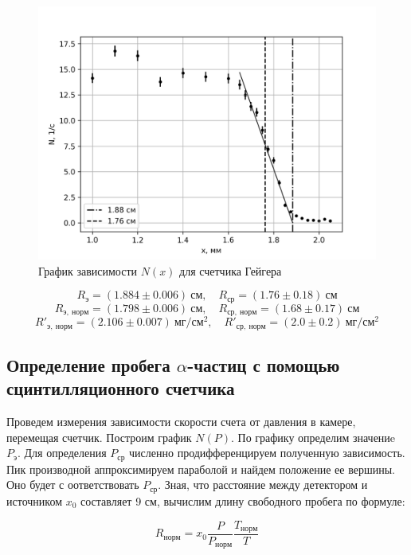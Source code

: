 \documentclass[14pt, a4paper]{report}
\begin{document}
\begin{figure}[H]
\centering
\includegraphics[width=.8\linewidth]{../images/541-4}
\caption{График зависимости $N(x)$ для счетчика Гейгера}
\end{figure}

\[R_{э}=(1.884\pm0.006)\ см,\quad R_{ср}=(1.76\pm0.18)\ см\]
\[R_{э,\ норм}=(1.798\pm0.006)\ см,\quad R_{ср,\ норм}=(1.68\pm0.17)\ см\]
\[R'_{э,\ норм}=(2.106\pm0.007)\ мг/см^2,\quad R'_{ср,\ норм}=(2.0\pm0.2)\ мг/см^2\]

\newpage

\subsection{Определение пробега $\alpha$-частиц с помощью сцинтилляционного счетчика}

Проведем измерения зависимости скорости счета от давления в камере, перемещая счетчик. Построим график $N(P)$. По графику определим значениe $P_{э}$. Для определения $P_{ср}$ численно продифференцируем полученную зависимость. Пик производной аппроксимируем параболой и найдем положение ее вершины. Оно будет с	оответствовать $P_{ср}$. Зная, что расстояние между детектором и источником $x_0$ составляет 9 см, вычислим длину свободного пробега по формуле:

\[R_{норм}=x_0\frac{P}{P_{норм}}\frac{T_{норм}}{T}\]
\end{document}
